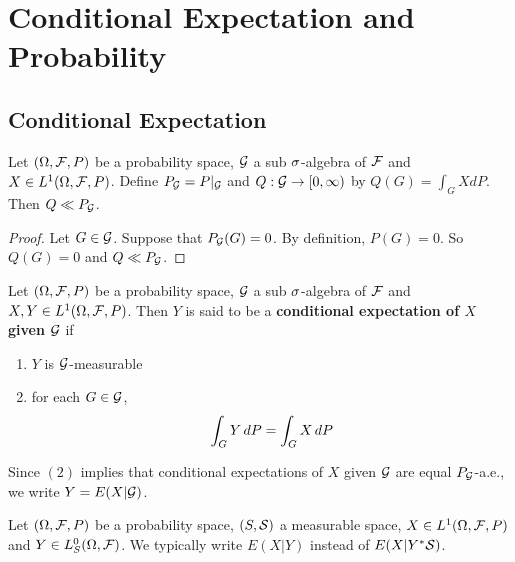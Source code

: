 \documentclass{book}
\begin{document}
	
	
	
	
	
	
	
	
	
	
	
	
	
	
	
	
	
	
	
	\newpage
	\chapter{Conditional Expectation and Probability}
	
	\section{Conditional Expectation}
	
	\begin{ex}
		Let $(\Omega, \mathcal{F}, P)$ be a probability space, $\mathcal{G}$ a sub $\sigma$-algebra of $\mathcal{F}$ and $X \in L^1(\Omega, \mathcal{F}, P)$. Define $P_{\mathcal{G}} = P|_{\mathcal{G}}$ and $Q: \mathcal{G} \rightarrow [0,\infty)$ by $Q(G) = \int_G X d P $. Then $Q \ll P_{\mathcal{G}}$. 
	\end{ex}	
	
	\begin{proof}
		Let $G \in \mathcal{G}$. Suppose that $P_{\mathcal{G}}(G) = 0$. By definition, $P(G) = 0$. So $Q(G) = 0$ and $Q \ll P_{\mathcal{G}}$.
	\end{proof}
	
	\begin{defn} 
	Let $(\Omega, \mathcal{F}, P)$ be a probability space, $\mathcal{G}$ a sub $\sigma$-algebra of $\mathcal{F}$ and $X, Y \in L^1(\Omega, \mathcal{F}, P)$. Then $Y $ is said to be a \textbf{conditional expectation of $X$ given $\mathcal{G}$} if 
	\begin{enumerate}
	\item $Y$ is $\mathcal{G}$-measurable
	\item for each $G \in \mathcal{G}$, 
	$$\int_G Y \, d P = \int_G X \, d P$$ 
	\end{enumerate}	 
	Since $(2)$ implies that conditional expectations of $X$ given $\mathcal{G}$ are equal $P_{\mathcal{G}}$-a.e., we write $Y = E(X|\mathcal{G})$.
	\end{defn}		

	\begin{note}
		Let $(\Omega, \mathcal{F}, P)$ be a probability space, $(S, \mathcal{S})$ a measurable space, $X \in L^1(\Omega, \mathcal{F}, P)$ and $Y \in L^0_S(\Omega, \mathcal{F})$. We typically write $E(X|Y)$ instead of $E(X| Y^*\mathcal{S})$.
	\end{note}
	
\end{document}
